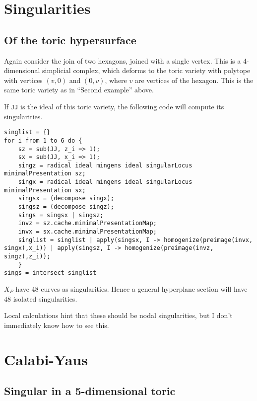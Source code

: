 \documentclass[11pt, english]{article}
\begin{document}
\section{Singularities}

\subsection{Of the toric hypersurface}

Again consider the join of two hexagons, joined with a single vertex. This is a 4-dimensional simplicial complex, which deforms to the toric variety with polytope with vertices $(v,0)$ and $(0,v)$, where $v$ are vertices of the hexagon. This is the same toric variety as in ``Second example'' above.

If \texttt{JJ} is the ideal of this toric variety, the following code will compute its singularities. 

\begin{lstlisting}
singlist = {}
for i from 1 to 6 do {
    sz = sub(JJ, z_i => 1);
    sx = sub(JJ, x_i => 1);
    singz = radical ideal mingens ideal singularLocus  minimalPresentation sz;
    singx = radical ideal mingens ideal singularLocus  minimalPresentation sx;
    singsx = (decompose singx);
    singsz = (decompose singz);
    sings = singsx | singsz;
    invz = sz.cache.minimalPresentationMap;
    invx = sx.cache.minimalPresentationMap;
    singlist = singlist | apply(singsx, I -> homogenize(preimage(invx, singx),x_i)) | apply(singsz, I -> homogenize(preimage(invz, singz),z_i));
    }
sings = intersect singlist
\end{lstlisting}

$X_P$ have $48$ curves as singularities. Hence a general hyperplane section will have $48$ isolated singularities.

\begin{remark}
Local calculations hint that these should be nodal singularities, but I don't immediately know how to see this.
\end{remark}

\section{Calabi-Yaus}

\subsection{Singular in a 5-dimensional toric}
\end{document}

